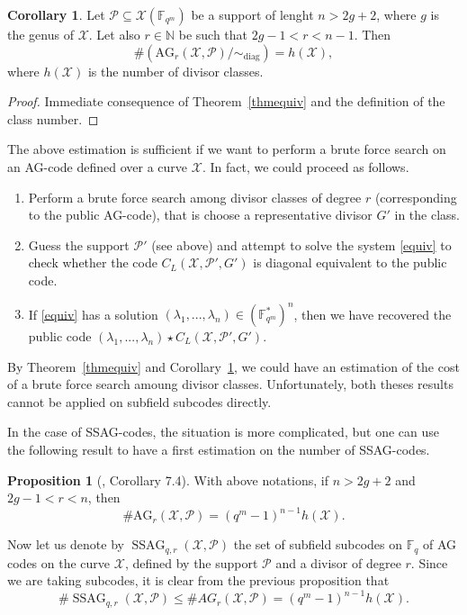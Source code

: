 \documentclass[10pt]{article}
\theoremstyle{definition}
\newtheorem{prop1}[thm]{Proposition}
\newtheorem{coro1}[thm]{Corollary}
\theoremstyle{definition}
\theoremstyle{definition}
\newcommand{\s}{\vspace{0.3cm}}
\newcommand{\N}{\mathbb{N}}
\newcommand{\fqm}{\mathbb{F}_{q^m}}
\newcommand{\fq}{\mathbb{F}_q}
\newcommand{\su}{\subseteq}
\newcommand{\X}{\mathcal{X}}
\newcommand{\PR}{\mathcal{P}}
\newcommand{\ssag}{\operatorname{SSAG}}
\begin{document}
\s

\begin{coro1} \label{nbAGr}
Let $\PR \su \X(\fqm)$ be a support of lenght $n > 2g+2$, where $g$ is the genus of $\X$. Let also $r \in \N$ be such that $2g-1 < r < n-1$. Then 
\[ \#\left(\mathrm{AG}_r(\X,\PR)/ \sim_{\mathrm{diag}}\right)= h(\X),\]
where $h(\X)$ is the number of divisor classes.
\end{coro1}

\s

\begin{proof}
Immediate consequence of Theorem~\ref{thmequiv} and the definition of the class number.
\end{proof}

\s

The above estimation is sufficient if we want to perform a brute force search on an AG-code defined over a curve $\X$. In fact, we could proceed as follows.
\begin{enumerate}
\item Perform a brute force search among divisor classes of degree $r$ (corresponding to the public AG-code), that is choose a representative divisor $G'$ in the class.
\item Guess the support $\PR'$ (see above) and attempt to solve the system \eqref{equiv} to check whether the code $C_L(\X,\PR',G')$ is diagonal equivalent to the public code.
\item If \eqref{equiv} has a solution $(\lambda_1,...,\lambda_n) \in (\fqm^*)^n$, then we have recovered the public code $(\lambda_1,...,\lambda_n) \star C_L(\X,\PR',G')$.
\end{enumerate}

By Theorem~\ref{thmequiv} and Corollary~\ref{nbAGr}, we could have an estimation of the cost of a brute force search amoung divisor classes. Unfortunately, both theses results cannot be applied on subfield subcodes directly.

\s

In the case of SSAG-codes, the situation is more complicated, but one can use the following result to have a first estimation on the number of SSAG-codes.

\s

\begin{prop1}[\cite{CMRP}, Corollary 7.4] 
With above notations, if $n>2g+2$ and $2g-1<r<n$, then 
\[\#\mathrm{AG}_r(\X,\PR) = (q^m-1)^{n-1}h(\X).\]
\end{prop1}

Now let us denote by $\ssag_{q,r}(\X,\PR)$ the set of subfield subcodes on $\fq$ of AG codes on the curve $\X$, defined by the support $\PR$ and a divisor of degree $r$. Since we are taking subcodes, it is clear from the previous proposition that 
\[\#\ssag_{q,r}(\X,\PR) \leq \#AG_r(\X,\PR) = (q^m-1)^{n-1}h(\X).\]
\end{document}
